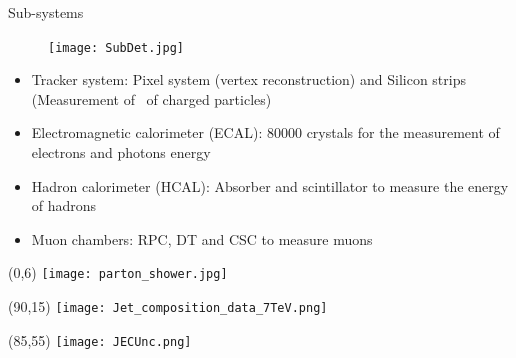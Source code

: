 \begin{frame}{Sub-systems}
\vspace{-.2cm}
\begin{figure}[!Hhtbp]
  \begin{center}
    \texttt{[image: SubDet.jpg]}
  \end{center}
\end{figure}
\vspace{-.4cm}
\begin{block}{}
\begin{itemize}\tiny
\item Tracker system: Pixel system (vertex reconstruction) and Silicon strips (Measurement of \pt~of charged particles)
\item Electromagnetic calorimeter (ECAL): 80000 crystals for the measurement of electrons and photons energy
\item Hadron calorimeter (HCAL): Absorber and scintillator to measure the energy of hadrons
\item Muon chambers: RPC, DT and CSC to measure muons \pt
\end{itemize}
\end{block}

\end{frame}


\begin{frame}{}
\vspace{-.2cm}

\begin{textblock}{95}(0,6)
    \texttt{[image: parton\_shower.jpg]}
\end{textblock}
\begin{textblock}{40}(90,15)
\texttt{[image: Jet\_composition\_data\_7TeV.png]}
\end{textblock}
\begin{textblock}{42}(85,55)
\texttt{[image: JECUnc.png]}
\end{textblock}

\end{frame}


